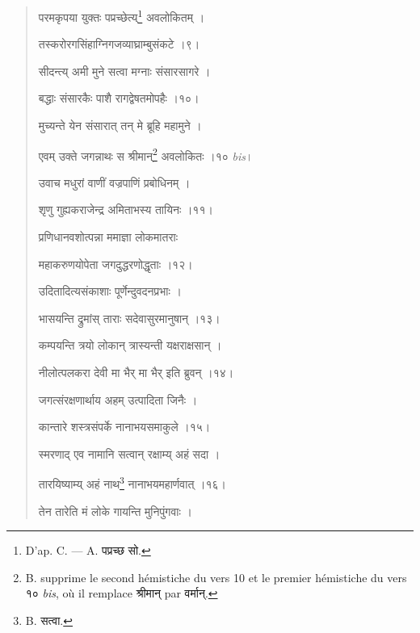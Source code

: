 \documentclass[a4paper, 11pt, oneside, french, landscape, twocolumn]{article}
\begin{document}
\begin{quotation}
\bigskip

\texthindi{परमकृपया युक्तः पप्रच्छेत्य्}\footnote{D'ap. C. --- A. \texthindi{पप्रच्छ सो}.} \texthindi{अवलोकितम् ।}

\texthindi{तस्करोरगसिंहाग्निगजव्याघ्राम्बुसंकटे ।९।}

\bigskip

\texthindi{सीदन्त्य् अमी मुने सत्वा मग्नाः संसारसागरे ।}

\texthindi{बद्धाः संसारकैः पाशै रागद्वेषतमोपहैः ।१०।}

\bigskip

\texthindi{मुच्यन्ते येन संसारात् तन् मे ब्रूहि महामुने ।}

\texthindi{एवम् उक्ते जगन्नाथः स श्रीमान्}\footnote{B. supprime le second hémistiche du vers 10 et le premier hémistiche du vers \texthindi{१०} \emph{bis}, où il remplace \texthindi{श्रीमान्} par \texthindi{वर्मान्}.} \texthindi{अवलोकितः ।१० }\emph{bis}\texthindi{।}

\bigskip

\texthindi{उवाच मधुरां वाणीं वज्रपाणिं प्रबोधिनम् ।}

\texthindi{शृणु गुह्यकराजेन्द्र अमिताभस्य तायिनः ।११।}

\bigskip

\texthindi{प्रणिधानवशोत्पन्ना ममाज्ञा लोकमातराः}

\texthindi{महाकरुणयोपेता जगदुद्धरणोद्धृताः ।१२।}

\bigskip

\texthindi{उदितादित्यसंकाशाः पूर्णेन्दुवदनप्रभाः ।}

\texthindi{भासयन्ति द्रुमांस् ताराः सदेवासुरमानुषान् ।१३।}

\bigskip

\texthindi{कम्पयन्ति त्रयो लोकान् त्रास्यन्ती यक्षराक्षसान् ।}

\texthindi{नीलोत्पलकरा देवी मा भैर् मा भैर् इति ब्रुवन् ।१४।}

\bigskip

\texthindi{जगत्संरक्षणार्थाय अहम् उत्पादिता जिनैः ।}

\texthindi{कान्तारे शस्त्रसंपर्के नानाभयसमाकुले ।१५।}

\bigskip

\texthindi{स्मरणाद् एव नामानि सत्वान् रक्षाम्य् अहं सदा ।}

\texthindi{तारयिष्याम्य् अहं नाथ}\footnote{B. \texthindi{सत्वा}.} \texthindi{नानाभयमहार्णवात् ।१६।}

\bigskip

\texthindi{तेन तारेति मं लोके गायन्ति मुनिपुंगवाः ।}


\end{quotation}
\end{document}
